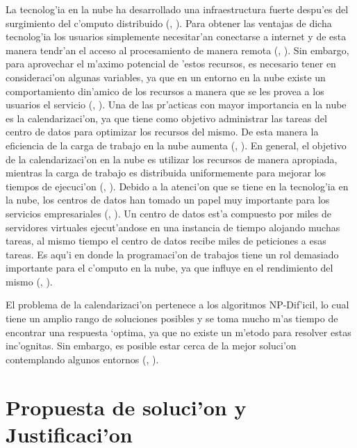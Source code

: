 La tecnolog'ia en la nube ha desarrollado una infraestructura fuerte despu'es del surgimiento del c'omputo distribuido (\citeauthor{chen2009cloud}, \citeyear{chen2009cloud}). Para obtener las ventajas de dicha tecnolog'ia los usuarios simplemente necesitar'an conectarse a internet y de esta manera tendr'an el acceso al procesamiento de manera remota (\citeauthor{aranganathan2011aco}, \citeyear{aranganathan2011aco}). Sin embargo, para aprovechar el m'aximo potencial de 'estos recursos, es necesario tener en consideraci'on algunas variables, ya que en un entorno en la nube existe un comportamiento din'amico de los recursos a manera que se les provea a los usuarios el servicio (\citeauthor{shimpy2014different}, \citeyear{shimpy2014different}).
Una de las pr'acticas con mayor importancia en la nube es la calendarizaci'on, ya que tiene como objetivo administrar las tareas del centro de datos para optimizar los recursos del mismo. De esta manera la eficiencia de la carga de trabajo en la nube aumenta (\citeauthor{shimpy2014different}, \citeyear{shimpy2014different}).
En general, el objetivo de la calendarizaci'on en la nube es utilizar los recursos de manera apropiada, mientras la carga de trabajo es distribuida uniformemente para mejorar los tiempos de ejecuci'on (\citeauthor{shimpy2014different}, \citeyear{shimpy2014different}).
Debido a la atenci'on que se tiene en la tecnolog'ia en la nube, los centros de datos han tomado un papel muy importante para los servicios empresariales (\citeauthor{shimpy2014different}, \citeyear{shimpy2014different}). 
Un centro de datos est'a compuesto por miles de servidores virtuales ejecut'andose en una instancia de tiempo alojando muchas tareas, al mismo tiempo el centro de datos recibe miles de peticiones a esas tareas. Es aqu'i en donde la programaci'on de trabajos tiene un rol demasiado importante para el c'omputo en la nube, ya que influye en el rendimiento del mismo (\citeauthor{srinivasan2014cloud}, \citeyear{srinivasan2014cloud}). 

El problema de la calendarizaci'on pertenece a los algoritmos NP-Dif'icil, lo cual tiene un amplio rango de soluciones posibles y se toma mucho m'as tiempo de encontrar una respuesta ‘optima, ya que no existe un m'etodo para resolver estas inc'ognitas. Sin embargo, es posible estar cerca de la mejor soluci'on contemplando algunos entornos (\citeauthor{shimpy2014different}, \citeyear{shimpy2014different}).




\section*{Propuesta de soluci'on y Justificaci'on}


